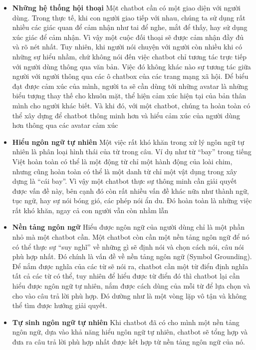 \documentclass[12pt]{report}
\begin{document}
\begin{itemize}
	\item \textbf{Những hệ thống hội thoại}
	Một chatbot cần có một giao diện với người dùng. Trong thực tế, khi con người giao tiếp với nhau, chúng ta sử dụng rất nhiều các giác quan để cảm nhận như tai để nghe, mắt để thấy, hay sử dụng xúc giác để cảm nhận. Vì vậy một cuộc đối thoại sẽ được cảm nhận đầy đủ và rõ nét nhất. Tuy nhiên, khi người nói chuyện với người còn nhiều khi có những sự hiểu nhầm, chứ không nói đến việc chatbot chỉ tương tác trực tiếp với người dùng thông qua văn bản. Việc đó không khác nào sự tương tác giữa người với người thông qua các ô chatbox của các trang mạng xã hội. Để biểu đạt được cảm xúc của mình, người ta sẽ cần dùng tới những avatar là những biểu tượng thay thế cho khuôn mặt, thể hiện cảm xúc hiện tại của bản thân mình cho người khác biết. Và khi đó, với một chatbot, chúng ta hoàn toàn có thể xây dựng để chatbot thông minh hơn và hiểu cảm xúc của người dùng hơn thông qua các avatar cảm xúc
	\item \textbf{Hiểu ngôn ngữ tự nhiên}
	Một việc rất khó khăn trong xử lý ngôn ngữ tự nhiên là phân loại hình thái của từ trong câu. Ví dụ như từ ``bay'' trong tiếng Việt hoàn toàn có thể là một động từ chỉ một hành động của loài chim, nhưng cũng hoàn toàn có thể là một danh từ chỉ một vật dụng trong xây dựng là ``cái bay''. Vì vậy một chatbot thực sự thông minh cần giải quyết được vấn đề này, bên cạnh đó còn rất nhiều vấn đề khác nữa như thành ngữ, tục ngữ, hay sự nói bóng gió, các phép nói ẩn du. Đó hoàn toàn là những việc rất khó khăn, ngay cả con người vẫn còn nhầm lẫn
	\item \textbf{Nền tảng ngôn ngữ}
	Hiểu được ngôn ngữ của người dùng chỉ là một phần nhỏ mà một chatbot cần. Một chatbot còn cần một nền tảng ngôn ngữ để nó có thể thực sự ``suy nghĩ'' về những gì sẽ định nói và chọn cách nói, câu nói phù hợp nhất. Đó chính là vấn đề về nền tảng ngôn ngữ (Symbol Grounding). Để nắm được nghĩa của các từ sẽ nói ra, chatbot cần một từ điển định nghĩa tất cả các từ có thể, tuy nhiên để hiểu được từ điển đó thì chatbot lại cần hiểu được ngôn ngữ tự nhiên, nắm được cách dùng của mỗi từ để lựa chọn và cho vào câu trả lời phù hợp. Đó dường như là một vòng lặp vô tận và không thể tìm được hướng giải quyết.
	\item \textbf{Tự sinh ngôn ngữ tự nhiên}
	Khi chatbot đã có cho mình một nền tảng ngôn ngữ, dựa vào khả năng hiểu ngôn ngữ tự nhiên, chatbot sẽ tổng hợp và đưa ra câu trả lời phù hợp nhất được kết hợp từ nền tảng ngôn ngữ của nó.
\end{itemize}
\end{document}
